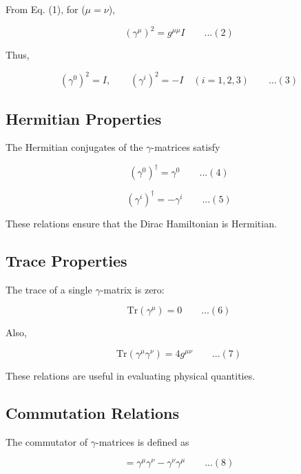 \documentclass[12pt]{report}
\begin{document}
From Eq. (1), for ($ \mu = \nu $),

\begin{equation*}
(\gamma^\mu)^2 = g^{\mu\mu} I\qquad ...(2)
\end{equation*}

Thus,

\begin{equation*}
(\gamma^0)^2 = I,\qquad(\gamma^i)^2 = -I \quad (i = 1,2,3)\qquad ...(3)
\end{equation*}

\subsection*{Hermitian Properties}

The Hermitian conjugates of the $\gamma$-matrices satisfy

\begin{equation*}
(\gamma^0)^\dagger = \gamma^0\qquad ...(4)
\end{equation*}

\begin{equation*}
(\gamma^i)^\dagger = -\gamma^i\qquad ...(5)
\end{equation*}

These relations ensure that the Dirac Hamiltonian is Hermitian.

\subsection*{Trace Properties}

The trace of a single $\gamma$-matrix is zero:

\begin{equation*}
\text{Tr}(\gamma^\mu) = 0\qquad ...(6)
\end{equation*}

Also,

\begin{equation*}
\text{Tr}(\gamma^\mu \gamma^\nu) = 4 g^{\mu\nu}\qquad ...(7)
\end{equation*}

These relations are useful in evaluating physical quantities.

\subsection*{Commutation Relations}

The commutator of $\gamma$-matrices is defined as

\begin{equation*}
[\gamma^\mu , \gamma^\nu] = \gamma^\mu \gamma^\nu - \gamma^\nu \gamma^\mu\qquad ...(8)
\end{equation*}
\end{document}
